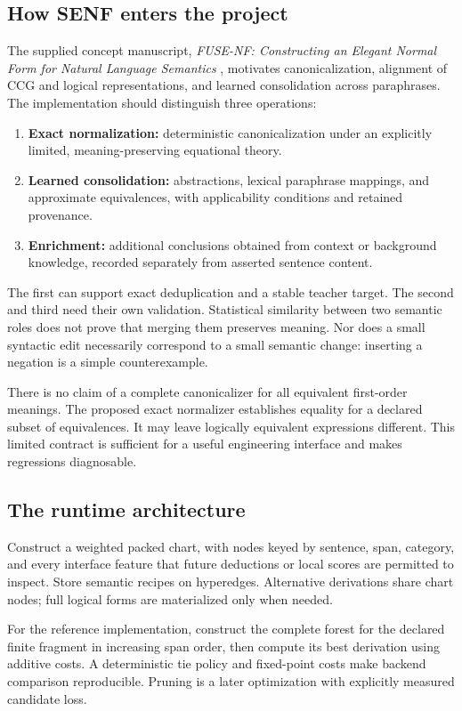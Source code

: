 \documentclass[11pt,a4paper]{article}
\begin{document}
\subsection*{How SENF enters the project}
The supplied concept manuscript, \emph{FUSE-NF: Constructing an Elegant Normal
Form for Natural Language Semantics} \cite{senf}, motivates canonicalization,
alignment of CCG and logical representations, and learned consolidation across
paraphrases. The implementation should distinguish three operations:
\begin{enumerate}
  \item \textbf{Exact normalization:} deterministic canonicalization under an
  explicitly limited, meaning-preserving equational theory.
  \item \textbf{Learned consolidation:} abstractions, lexical paraphrase
  mappings, and approximate equivalences, with applicability conditions and
  retained provenance.
  \item \textbf{Enrichment:} additional conclusions obtained from context or
  background knowledge, recorded separately from asserted sentence content.
\end{enumerate}
The first can support exact deduplication and a stable teacher target. The
second and third need their own validation. Statistical similarity between two
semantic roles does not prove that merging them preserves meaning. Nor does a
small syntactic edit necessarily correspond to a small semantic change:
inserting a negation is a simple counterexample.

There is no claim of a complete canonicalizer for all equivalent
first-order meanings. The proposed exact normalizer establishes equality for a
declared subset of equivalences. It may leave logically equivalent expressions
different. This limited contract is sufficient for a useful engineering
interface and makes regressions diagnosable.

\subsection*{The runtime architecture}
Construct a weighted packed chart, with nodes keyed by sentence, span,
category, and every interface feature that future deductions or local scores
are permitted to inspect. Store semantic recipes on hyperedges. Alternative
derivations share chart nodes; full logical forms are materialized only when
needed.

For the reference implementation, construct the complete forest for the
declared finite fragment in increasing span order, then compute its best
derivation using additive costs. A deterministic tie policy and fixed-point
costs make backend comparison reproducible. Pruning is a later optimization
with explicitly measured candidate loss.
\end{document}
